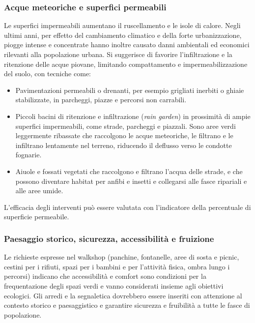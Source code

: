 \documentclass[
  a4paper,
]{book}
\providecommand{\tightlist}{%
  \setlength{\itemsep}{0pt}\setlength{\parskip}{0pt}}
\begin{document}
\subsubsection{Acque meteoriche e superfici permeabili}\label{acque-meteoriche-e-superfici-permeabili}

Le superfici impermeabili aumentano il ruscellamento e le isole di calore.
Negli ultimi anni, per effetto del cambiamento climatico e della forte urbanizzazione, piogge intense e concentrate hanno inoltre causato danni ambientali ed economici rilevanti alla popolazione urbana.
Si suggerisce di favorire l'infiltrazione e la ritenzione delle acque piovane, limitando compattamento e impermeabilizzazione del suolo, con tecniche come:

\begin{itemize}
\tightlist
\item
  Pavimentazioni permeabili o drenanti, per esempio grigliati inerbiti o ghiaie stabilizzate, in parcheggi, piazze e percorsi non carrabili.
\item
  Piccoli bacini di ritenzione e infiltrazione (\emph{rain garden}) in prossimità di ampie superfici impermeabili, come strade, parcheggi e piazzali. Sono aree verdi leggermente ribassate che raccolgono le acque meteoriche, le filtrano e le infiltrano lentamente nel terreno, riducendo il deflusso verso le condotte fognarie.
\item
  Aiuole e fossati vegetati che raccolgono e filtrano l'acqua delle strade, e che possono diventare habitat per anfibi e insetti e collegarsi alle fasce ripariali e alle aree umide.
\end{itemize}

L'efficacia degli interventi può essere valutata con l'indicatore della percentuale di superficie permeabile.

\subsubsection{Paesaggio storico, sicurezza, accessibilità e fruizione}\label{paesaggio-storico-sicurezza-accessibilituxe0-e-fruizione}

Le richieste espresse nel walkshop (panchine, fontanelle, aree di sosta e picnic, cestini per i rifiuti, spazi per i bambini e per l'attività fisica, ombra lungo i percorsi) indicano che accessibilità e comfort sono condizioni per la frequentazione degli spazi verdi e vanno considerati insieme agli obiettivi ecologici.
Gli arredi e la segnaletica dovrebbero essere inseriti con attenzione al contesto storico e paesaggistico e garantire sicurezza e fruibilità a tutte le fasce di popolazione.
\end{document}
